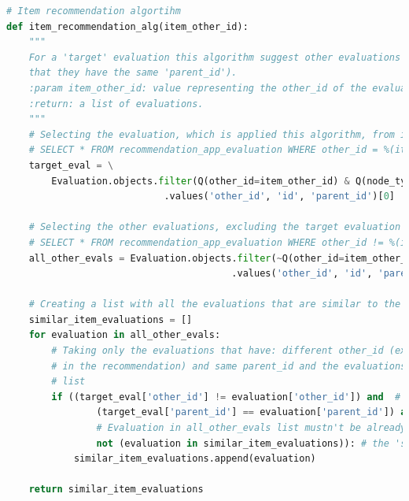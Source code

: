 \lstset{style=python_code_style}
\label{lst:CF_IB_Evaluation}
\begin{lstlisting}[language=Python, caption={Implementazione del CF-IB per le Evaluation presenti in Moon Cloud.}]
# Item recommendation algortihm
def item_recommendation_alg(item_other_id):
	"""
	For a 'target' evaluation this algorithm suggest other evaluations that belong to the same category (this means
	that they have the same 'parent_id').
	:param item_other_id: value representing the other_id of the evaluation.
	:return: a list of evaluations.
	"""
	# Selecting the evaluation, which is applied this algorithm, from its other_id
	# SELECT * FROM recommendation_app_evaluation WHERE other_id = %(item_other_id)s AND node_type = 'eva'
	target_eval = \
		Evaluation.objects.filter(Q(other_id=item_other_id) & Q(node_type="eva"))\
							.values('other_id', 'id', 'parent_id')[0]

	# Selecting the other evaluations, excluding the target evaluation
	# SELECT * FROM recommendation_app_evaluation WHERE other_id != %(item_other_id)s AND node_type = 'eva'
	all_other_evals = Evaluation.objects.filter(~Q(other_id=item_other_id) & Q(node_type="eva"))\
										.values('other_id', 'id', 'parent_id').order_by('other_id')

	# Creating a list with all the evaluations that are similar to the target evaluation (comparing the parent_id)
	similar_item_evaluations = []
	for evaluation in all_other_evals:
		# Taking only the evaluations that have: different other_id (excluding the target evaluation
		# in the recommendation) and same parent_id and the evaluations that weren't added to similar_item_evaluations
		# list
		if ((target_eval['other_id'] != evaluation['other_id']) and  # Evaluations must have different 'other_id'
				(target_eval['parent_id'] == evaluation['parent_id']) and  # Evaluations must have same 'parent_id'
				# Evaluation in all_other_evals list mustn't be already added to \
				not (evaluation in similar_item_evaluations)): # the 'similar_item_evaluations' list
			similar_item_evaluations.append(evaluation)

	return similar_item_evaluations	
\end{lstlisting}

